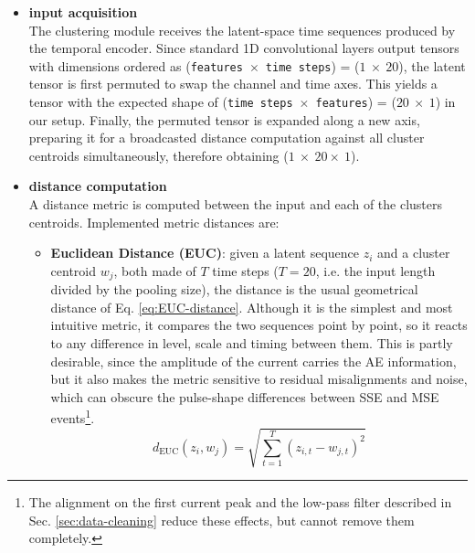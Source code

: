 \begin{itemize}
    \item \textbf{input acquisition}\\
    The clustering module receives the latent-space time sequences produced by the temporal encoder. Since standard 1D convolutional layers output tensors with dimensions ordered as (\texttt{features}~$\times$~\texttt{time steps}) = ($1~\times~20$), the latent tensor is first permuted to swap the channel and time axes. This yields a tensor with the expected shape of (\texttt{time steps}~$\times$~\texttt{features}) = ($20~\times~1$) in our setup. Finally, the permuted tensor is expanded along a new axis, preparing it for a broadcasted distance computation against all cluster centroids simultaneously, therefore obtaining ($1~\times~20\times~1$). 

    \item \textbf{distance computation}\\
    A distance metric is computed between the input and each of the clusters centroids. Implemented metric distances are:
    \begin{itemize}
        \item \textbf{Euclidean Distance (EUC)}: given a latent sequence $z_i$ and a cluster centroid $w_j$, both made of $T$ time steps ($T = 20$, i.e. the input length divided by the pooling size), the distance is the usual geometrical distance of Eq. \ref{eq:EUC-distance}. Although it is the simplest and most intuitive metric, it compares the two sequences point by point, so it reacts to any difference in level, scale and timing between them. This is partly desirable, since the amplitude of the current carries the \ac{AE} information, but it also makes the metric sensitive to residual misalignments and noise, which can obscure the pulse-shape differences between \ac{SSE} and \ac{MSE} events\footnote{The alignment on the first current peak and the low-pass filter described in Sec. \ref{sec:data-cleaning} reduce these effects, but cannot remove them completely.}.
        \begin{equation}
            \label{eq:EUC-distance}
            d_\text{EUC}(z_i, w_j) = \sqrt{\sum_{t=1}^{T} (z_{i, t} - w_{j, t})^2}
        \end{equation}


\end{itemize}
\end{itemize}
